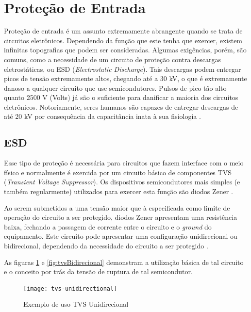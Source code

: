 \section{Proteção de Entrada}\label{sec:InputProtection}

Proteção de entrada é um assunto extremamente abrangente quando se trata de circuitos eletrônicos. Dependendo da função que este tenha que exercer, existem infinitas topografias que podem ser consideradas. Algumas exigências, porém, são comuns, como a necessidade de um circuito de proteção contra descargas eletrostáticas, ou \gls{ESD} (\textit{Electrostatic Discharge}). Tais descargas podem entregar picos de tensão extremamente altos, chegando até a 30 kV, o que é extremamente danoso a qualquer circuito que use semicondutores. Pulsos de pico tão alto quanto 2500 V (Volts) já são o suficiente para danificar a maioria dos circuitos eletrônicos. Notoriamente, seres humanos são capazes de entregar descargas de até 20 kV por consequência da capacitância inata à sua fisiologia \cite{ONsemicondTVS2}.

\subsection{ESD}\label{subsec:electrostaticDischarge}
Esse tipo de proteção é necessária para circuitos que fazem interface com o meio físico e normalmente é exercida por um circuito básico de componentes \gls{TVS} (\textit{Transient Voltage Suppressor}). Os dispositivos semicondutores mais simples (e também regularmente) utilizados para exercer esta função são diodos Zener \cite{IPblog}.

Ao serem submetidos a uma tensão maior que à especificada como limite de operação do circuito a ser protegido, diodos Zener apresentam uma resistência baixa, fechando a passagem de corrente entre o circuito e o \textit{ground} do equipamento. Este circuito pode apresentar uma configuração unidirecional ou bidirecional, dependendo da necessidade do circuito a ser protegido \cite{TIESD}.

As figuras \ref{fig:tvsUnidirecional} e \ref{fig:tvsBidirecional} demonstram a utilização básica de tal circuito e o conceito por trás da tensão de ruptura de tal semicondutor.

\begin{figure}[htb!]%
    \caption{Exemplo de uso TVS Unidirecional}%
    \label{fig:tvsUnidirecional}%
    \texttt{[image: tvs-unidirectional]}%
\end{figure}

